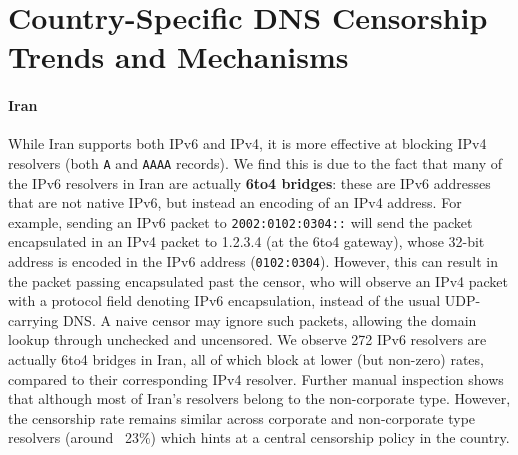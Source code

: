 \section{Country-Specific DNS Censorship Trends and Mechanisms}
\label{sec:cases}



\paragraph{Iran}
While Iran supports both IPv6 and IPv4, it is more effective at blocking IPv4
resolvers (both \texttt{A} and \texttt{AAAA} records). We find this is due to
the fact that many of the IPv6 resolvers in Iran are actually \textbf{6to4 bridges}: these
are IPv6 addresses that are not native IPv6, but instead an encoding of an IPv4
address. For example, sending an IPv6 packet to \texttt{2002:0102:0304::} will
send the packet encapsulated in an IPv4 packet to 1.2.3.4 (at the 6to4 gateway),
whose 32-bit address is encoded in the IPv6 address (\texttt{0102:0304}).
However, this can result in the packet passing encapsulated past the censor, who
will observe an IPv4 packet with a protocol field denoting IPv6 encapsulation,
instead of the usual UDP-carrying DNS. A naive censor may ignore such packets,
allowing the domain lookup through unchecked and uncensored. We observe 272 IPv6
resolvers are actually 6to4 bridges in Iran, all of which block at lower
(but non-zero) rates, compared to their corresponding IPv4 resolver.
Further manual inspection shows that although most of Iran's resolvers belong
to the non-corporate type. However, the censorship rate remains similar across
corporate and non-corporate type resolvers (around ~23\%) which hints at a central
censorship policy in the country. 


